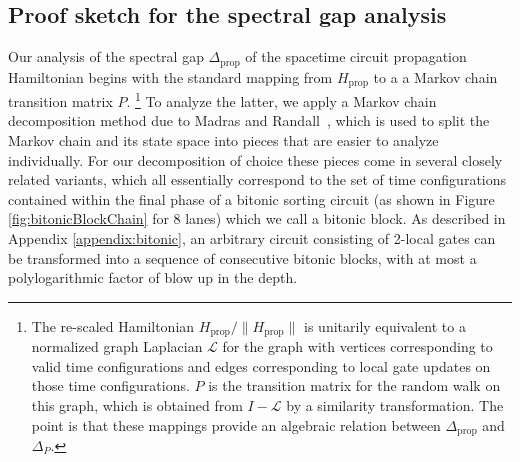 \documentclass[11pt,letterpaper]{article}
\theoremstyle{definition}
\theoremstyle{remark}
\numberwithin{equation}{section}
\theoremstyle{definition}
\begin{document}
\subsection{Proof sketch for the spectral gap analysis}\label{sec:sketch}
Our analysis of the spectral gap $\Delta_\textrm{prop}$ of the spacetime circuit propagation Hamiltonian begins with the standard mapping from $H_\textrm{prop}$ to a a Markov chain transition matrix $P$. \footnote{The re-scaled Hamiltonian $H_{\textrm{prop}}/\|H_{\textrm{prop}}\|$ is unitarily equivalent to a normalized graph Laplacian $\mathcal{L}$ for the graph with vertices corresponding to valid time configurations and edges corresponding to local gate updates on those time configurations.  $P$ is the transition matrix for the random walk on this graph, which is obtained from $I-\mathcal{L}$ by a similarity transformation.  The point is that these mappings provide an algebraic relation between $\Delta_{\textrm{prop}}$ and $\Delta_P$.}  To analyze the latter, we apply a Markov chain decomposition method due to Madras and Randall~\cite{madras2002}, which is used to split the Markov chain and its state space into pieces that are easier to analyze individually.  For our decomposition of choice these pieces come in several closely related variants, which all essentially correspond to the set of time configurations contained within the final phase of a bitonic sorting circuit (as shown in Figure \ref{fig:bitonicBlockChain} for 8 lanes) which we call a bitonic block.  As described in Appendix \ref{appendix:bitonic}, an arbitrary circuit consisting of 2-local gates can be transformed into a sequence of consecutive bitonic blocks, with at most a polylogarithmic factor of blow up in the depth. 
\end{document}
